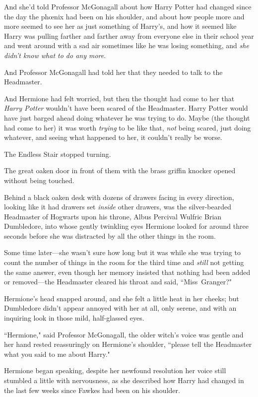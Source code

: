 And she'd told Professor McGonagall about how Harry Potter had changed since the day the phœnix had been on his shoulder, and about how people more and more seemed to see her as just something of Harry's, and how it seemed like Harry was pulling farther and farther away from everyone else in their school year and went around with a sad air sometimes like he was losing something, and \emph{she didn't know what to do any more}.

And Professor McGonagall had told her that they needed to talk to the Headmaster.

And Hermione had felt worried, but then the thought had come to her that \emph{Harry Potter} wouldn't have been scared of the Headmaster. Harry Potter would have just barged ahead doing whatever he was trying to do. Maybe (the thought had come to her) it was worth \emph{trying} to be like that, \emph{not} being scared, just doing whatever, and seeing what happened to her, it couldn't really be worse.

The Endless Stair stopped turning.

The great oaken door in front of them with the brass griffin knocker opened without being touched.

Behind a black oaken desk with dozens of drawers facing in every direction, looking like it had drawers set \emph{inside} other drawers, was the silver-bearded Headmaster of Hogwarts upon his throne, Albus Percival Wulfric Brian Dumbledore, into whose gently twinkling eyes Hermione looked for around three seconds before she was distracted by all the other things in the room.

Some time later—she wasn't sure how long but it was while she was trying to count the number of things in the room for the third time and \emph{still} not getting the same answer, even though her memory insisted that nothing had been added or removed—the Headmaster cleared his throat and said, ``Miss~Granger?"

Hermione's head snapped around, and she felt a little heat in her cheeks; but Dumbledore didn't appear annoyed with her at all, only serene, and with an inquiring look in those mild, half-glassed eyes.

``Hermione," said Professor McGonagall, the older witch's voice was gentle and her hand rested reassuringly on Hermione's shoulder, ``please tell the Headmaster what you said to me about Harry."

Hermione began speaking, despite her newfound resolution her voice still stumbled a little with nervousness, as she described how Harry had changed in the last few weeks since Fawkes had been on his shoulder.


